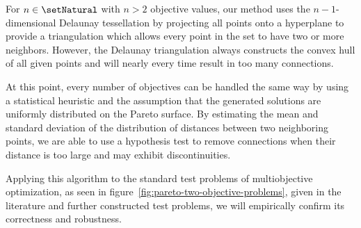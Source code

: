 \documentclass{stdlocal}
\begin{document}
  For $n\in\setNatural$ with $n>2$ objective values, our method uses the $n-1$-dimensional Delaunay tessellation by projecting all points onto a hyperplane to provide a triangulation which allows every point in the set to have two or more neighbors.
  However, the Delaunay triangulation always constructs the convex hull of all given points and will nearly every time result in too many connections.

  At this point, every number of objectives can be handled the same way by using a statistical heuristic and the assumption that the generated solutions are uniformly distributed on the Pareto surface.
  By estimating the mean and standard deviation of the distribution of distances between two neighboring points, we are able to use a hypothesis test to remove connections when their distance is too large and may exhibit discontinuities.

  Applying this algorithm to the standard test problems of multiobjective optimization, as seen in figure~\ref{fig:pareto-two-objective-problems}, given in the literature and further constructed test problems, we will empirically confirm its correctness and robustness.
\end{document}
